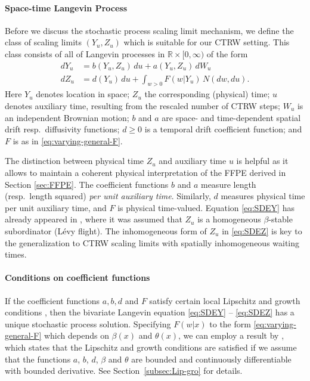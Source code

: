 \documentclass[a4paper,12pt]{elsarticle}
\numberwithin{equation}{section}
\theoremstyle{plain}
\theoremstyle{definition}
\theoremstyle{remark}
\numberwithin{equation}{section}
\newcommand{\spc}{\mathbb R}
\newcommand{\spctim}{\spc \times [0,\infty)}
\newcommand{\1}{\mathbf 1}
\begin{document}
\paragraph{Space-time Langevin Process}
Before we discuss the stochastic process scaling limit mechanism, we 
define the class of scaling limits $(Y_u, Z_u)$ which is suitable for our CTRW setting. This class consists of all of Langevin processes in 
$\spctim$ of the form
\begin{align} \label{eq:SDEY}
dY_u &= b(Y_{u}, Z_{u})\,du + a(Y_{u}, Z_{u})\, dW_u \\
\label{eq:SDEZ}
dZ_u &= d(Y_{u})\,du + \int_{w > 0} F(w | Y_{u}) \, N(dw, du).
\end{align}
Here $Y_u$ denotes location in space; $Z_u$ the corresponding (physical) time;
$u$ denotes auxiliary time, resulting from the rescaled number of CTRW steps;
$W_u$ is an independent Brownian motion; 
$b$ and $a$ are space- and time-dependent
spatial drift resp.\ diffusivity functions; $d \ge 0$ is a temporal drift coefficient function;
and $F$ is as in \eqref{eq:varying-general-F}.

The distinction between physical time $Z_u$ and auxiliary time $u$ is helpful
as it allows to maintain a coherent physical interpretation of the FFPE derived
in Section \ref{sec:FFPE}.  The coefficient functions $b$ and $a$ measure
length (resp.\ length squared) \emph{per unit auxiliary time}.  Similarly,
$d$ measures physical time per unit auxiliary time, and $F$ is physical
time-valued.
Equation \eqref{eq:SDEY} has already appeared in \cite{Weron2008}, where
it was assumed that $Z_u$ is a homogeneous $\beta$-stable subordinator (L\'evy
flight).
The inhomogeneous form of $Z_u$ in \eqref{eq:SDEZ} is key to the generalization
to CTRW scaling limits with spatially inhomogeneous waiting times.



\paragraph{Conditions on coefficient functions}
If the coefficient functions $a, b, d$ and $F$ satisfy certain local 
Lipschitz and growth conditions \cite[Chapter 6]{Applebaum}, then the bivariate
Langevin equation \eqref{eq:SDEY} -- \eqref{eq:SDEZ} has a unique stochastic 
process solution.  Specifying $F(w|x)$ to the form \eqref{eq:varying-general-F} which depends on 
$\beta(x)$ and $\theta(x)$, we can employ a result by \cite{Tsuchiya1992}, 
which states that the Lipschitz and growth conditions are 
satisfied if we assume that the functions $a$, $b$, $d$, $\beta$ and $\theta$ 
are bounded and continuously differentiable with bounded derivative.
See Section~\ref{subsec:Lip-gro} for details.
\end{document}
